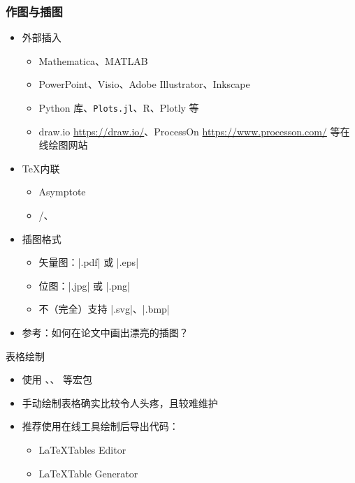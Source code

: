       \begin{frame}[fragile]
        \frametitle{作图与插图}
        \begin{itemize}
          \item 外部插入
      
            \begin{itemize}
              \item Mathematica、MATLAB
              \item PowerPoint、Visio、Adobe Illustrator、Inkscape
              \item Python  库、\texttt{Plots.jl}、R、Plotly 等
              \item draw.io \url{https://draw.io/}、ProcessOn \url{https://www.processon.com/} 等在线绘图网站
            \end{itemize}
      
          \item \TeX 内联
      
            \begin{itemize}
              \item Asymptote
              \item \alert{/、}
            \end{itemize}
      
          \item 插图格式
      
            \begin{itemize}
              \item 矢量图：|.pdf| 或 |.eps|
              \item 位图：|.jpg| 或 |.png|
              \item 不（完全）支持 |.svg|、|.bmp|
            \end{itemize}
      
          \item 参考：如何在论文中画出漂亮的插图？
        \end{itemize}
      \end{frame}
      
      \begin{frame}[fragile]{表格绘制}
        \begin{itemize}
          \item 使用 、、 等宏包
          \item 手动绘制表格确实比较令人头疼，且较难维护
          \item 推荐使用在线工具绘制后导出代码：
            \begin{itemize}
              \item \LaTeX Tables Editor 
              \item \LaTeX Table Generator 
            \end{itemize}
        \end{itemize}
      \end{frame}
      
